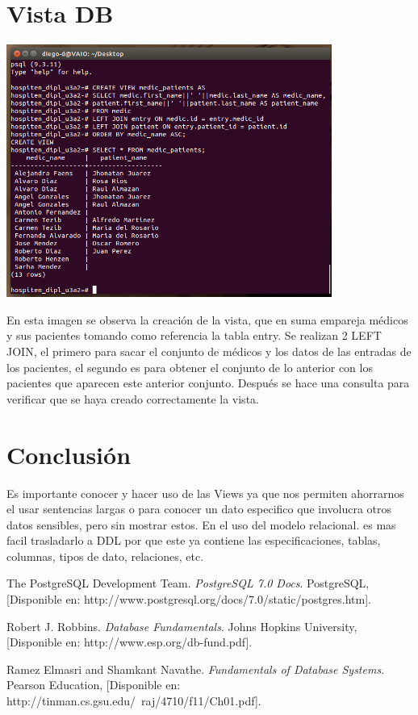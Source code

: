\documentclass[spanish,12pt,letterpapper]{article}
\begin{document}
	\section{Vista DB}
	\begin{center}
	\includegraphics[width=0.8\textwidth]{./view}~\\[1cm]
	\end{center}
	En esta imagen se observa la creación de la vista, que en suma empareja médicos y sus pacientes tomando como referencia la tabla entry. Se realizan 2 LEFT JOIN, el primero para sacar el conjunto de médicos y los datos de las entradas de los pacientes, el segundo es para obtener el conjunto de lo anterior con los pacientes que aparecen este anterior conjunto. Después se hace una consulta para verificar que se haya creado correctamente la vista.
	
	\section{Conclusión}
	Es importante conocer y hacer uso de las Views ya que nos permiten ahorrarnos el usar sentencias largas o para conocer un dato especifico que involucra otros datos sensibles, pero sin mostrar estos. En el uso del modelo relacional. es mas facil trasladarlo a DDL por que este ya contiene las especificaciones, tablas, columnas, tipos de dato, relaciones, etc.
	
	\pagebreak
	\begin{thebibliography}{9}	
	
	 The PostgreSQL Development Team. 
		\emph{PostgreSQL 7.0 Docs}. PostgreSQL, [Disponible en: http://www.postgresql.org/docs/7.0/static/postgres.htm].
	
		 Robert J. Robbins. 
		\emph{Database Fundamentals}. Johns Hopkins University, [Disponible en: http://www.esp.org/db-fund.pdf].
		
		 Ramez Elmasri and Shamkant Navathe. 
		\emph{Fundamentals of Database Systems}. Pearson Education, [Disponible en: http://tinman.cs.gsu.edu/~raj/4710/f11/Ch01.pdf].

	\end{thebibliography}
\end{document}
